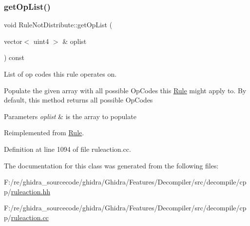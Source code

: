 \subsubsection{\texorpdfstring{getOpList()}{getOpList()}}
{\footnotesize\ttfamily void Rule\+Not\+Distribute\+::get\+Op\+List (\begin{DoxyParamCaption}\item[{vector$<$ uint4 $>$ \&}]{oplist }\end{DoxyParamCaption}) const\hspace{0.3cm}{\ttfamily [virtual]}}



List of op codes this rule operates on. 

Populate the given array with all possible Op\+Codes this \mbox{\hyperlink{class_rule}{Rule}} might apply to. By default, this method returns all possible Op\+Codes 
\begin{DoxyParams}{Parameters}
{\em oplist} & is the array to populate \\
\hline
\end{DoxyParams}


Reimplemented from \mbox{\hyperlink{class_rule_a4023bfc7825de0ab866790551856d10e}{Rule}}.



Definition at line 1094 of file ruleaction.\+cc.



The documentation for this class was generated from the following files\+:\begin{DoxyCompactItemize}
\item 
F\+:/re/ghidra\+\_\+sourcecode/ghidra/\+Ghidra/\+Features/\+Decompiler/src/decompile/cpp/\mbox{\hyperlink{ruleaction_8hh}{ruleaction.\+hh}}\item 
F\+:/re/ghidra\+\_\+sourcecode/ghidra/\+Ghidra/\+Features/\+Decompiler/src/decompile/cpp/\mbox{\hyperlink{ruleaction_8cc}{ruleaction.\+cc}}\end{DoxyCompactItemize}
